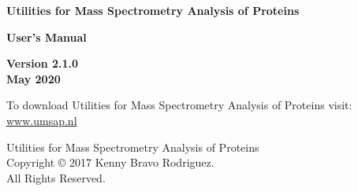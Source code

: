 \clearpage
\thispagestyle{empty}
\begin{center}
{\Huge\textbf{Utilities for Mass Spectrometry Analysis of Proteins}}

\vspace{60pt}

{\huge \textbf{User's Manual}}

\vspace{70pt}

{\Large \textbf{Version \num[parse-numbers=false,detect-weight]{2.1.0} \\ \vspace{10pt} May \num[detect-weight]{2020}}}

\vspace{140pt}

To download Utilities for Mass Spectrometry Analysis of Proteins visit: \\
\href{https://www.umsap.nl}{www.umsap.nl}

\vspace*{\fill}
Utilities for Mass Spectrometry Analysis of Proteins \\Copyright © \num[detect-weight]{2017} Kenny Bravo Rodriguez. \\All Rights Reserved.

\end{center}

\newpage
\thispagestyle{empty}
 \label{sec:tableofcontent}
\tableofcontents

\newpage
\thispagestyle{empty}
 \label{sec:listoffig}
\listoffigures

\newpage
\thispagestyle{empty}
 \label{sec:listoftables}
\listoftables